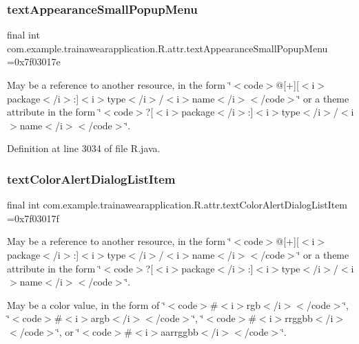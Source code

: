 \subsubsection{\texorpdfstring{textAppearanceSmallPopupMenu}{textAppearanceSmallPopupMenu}}
{\footnotesize\ttfamily final int com.\+example.\+trainawearapplication.\+R.\+attr.\+text\+Appearance\+Small\+Popup\+Menu =0x7f03017e\hspace{0.3cm}{\ttfamily [static]}}

May be a reference to another resource, in the form \char`\"{}$<$code$>$@\mbox{[}+\mbox{]}\mbox{[}$<$i$>$package$<$/i$>$\+:\mbox{]}$<$i$>$type$<$/i$>$/$<$i$>$name$<$/i$>$$<$/code$>$\char`\"{} or a theme attribute in the form \char`\"{}$<$code$>$?\mbox{[}$<$i$>$package$<$/i$>$\+:\mbox{]}$<$i$>$type$<$/i$>$/$<$i$>$name$<$/i$>$$<$/code$>$\char`\"{}. 

Definition at line 3034 of file R.\+java.

\mbox{\label{classcom_1_1example_1_1trainawearapplication_1_1_r_1_1attr_a5be0e14e8d88290050c3a42d716580b8}} 
\subsubsection{\texorpdfstring{textColorAlertDialogListItem}{textColorAlertDialogListItem}}
{\footnotesize\ttfamily final int com.\+example.\+trainawearapplication.\+R.\+attr.\+text\+Color\+Alert\+Dialog\+List\+Item =0x7f03017f\hspace{0.3cm}{\ttfamily [static]}}

May be a reference to another resource, in the form \char`\"{}$<$code$>$@\mbox{[}+\mbox{]}\mbox{[}$<$i$>$package$<$/i$>$\+:\mbox{]}$<$i$>$type$<$/i$>$/$<$i$>$name$<$/i$>$$<$/code$>$\char`\"{} or a theme attribute in the form \char`\"{}$<$code$>$?\mbox{[}$<$i$>$package$<$/i$>$\+:\mbox{]}$<$i$>$type$<$/i$>$/$<$i$>$name$<$/i$>$$<$/code$>$\char`\"{}. 

May be a color value, in the form of \char`\"{}$<$code$>$\#$<$i$>$rgb$<$/i$>$$<$/code$>$\char`\"{}, \char`\"{}$<$code$>$\#$<$i$>$argb$<$/i$>$$<$/code$>$\char`\"{}, \char`\"{}$<$code$>$\#$<$i$>$rrggbb$<$/i$>$$<$/code$>$\char`\"{}, or \char`\"{}$<$code$>$\#$<$i$>$aarrggbb$<$/i$>$$<$/code$>$\char`\"{}. 

